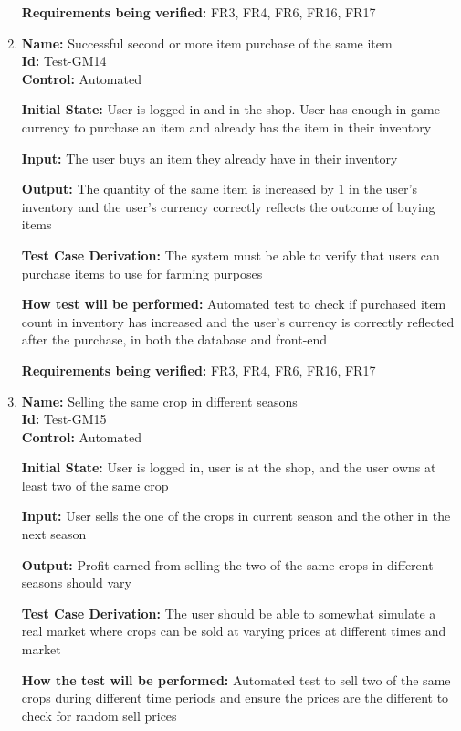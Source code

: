 \documentclass[12pt, titlepage]{article}
\begin{document}
\begin{enumerate}
\textbf{Requirements being verified:} FR3, FR4, FR6, FR16, FR17
\item {\textbf{Name:} Successful second or more item purchase of the same item\\} %
\textbf{Id:} Test-GM14 \label{Test-GM14}\\

\textbf{Control:} Automated

\textbf{Initial State:} User is logged in and in the shop. User has enough in-game currency to purchase an item and already has the item in their inventory

\textbf{Input:} The user buys an item they already have in their inventory 

\textbf{Output:} The quantity of the same item is increased by 1 in the user's inventory and the user's currency correctly reflects the outcome of buying items

\textbf{Test Case Derivation: }The system must be able to verify that users can purchase items to use for farming purposes

\textbf{How test will be performed:} Automated test to check if purchased item count in inventory has increased and the user’s currency is correctly reflected after the purchase, in both the database and front-end

\textbf{Requirements being verified:} FR3, FR4, FR6, FR16, FR17

\item{\textbf{Name:} Selling the same crop in different seasons\\} %
\textbf{Id:} Test-GM15 \label{Test-GM15}\\

\textbf{Control: }Automated

\textbf{Initial State:} User is logged in, user is at the shop, and the user owns at least two of the same crop

\textbf{Input:} User sells the one of the crops in current season and the other in the next season

\textbf{Output:} Profit earned from selling the two of the same crops in different seasons should vary 

\textbf{Test Case Derivation:} The user should be able to somewhat simulate a real market where crops can be sold at varying prices at different times and market

\textbf{How the test will be performed:} Automated test to sell two of the same crops during different time periods and ensure the prices are the different to check for random sell prices


\end{enumerate}
\end{document}
